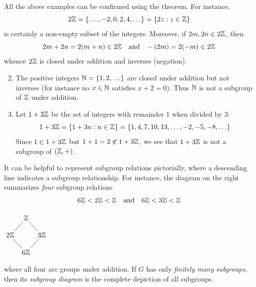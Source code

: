 
\vspace{-5pt}

\begin{examples}{}{}
\exstart All the above examples can be confirmed using the theorem. For instance,
\[2\mathbb{Z}=\{\ldots,-2,0,2,4,\ldots\}=\{2z:z\in\mathbb{Z}\}\]
is certainly a non-empty subset of the integers. Moreover, if $2m,2n\in 2\mathbb{Z}$, then
\[2m+2n=2(m+n)\in 2\mathbb{Z}\quad \text{and}\quad \!-(2m)=2(-m)\in 2\mathbb{Z}\]
whence $2\mathbb{Z}$ is closed under addition and inverses (negation).
\begin{enumerate}\setcounter{enumi}{1}
  \item The positive integers $\mathbb{N}=\{1,2,\ldots \}$ are closed under addition but not inverses (for instance no $x\in\mathbb{N}$ satisfies $x+2=0$). Thus $\mathbb{N}$ is not a subgroup of $\mathbb{Z}$ under addition.
	\item\label{intro:modex} Let $1+3\mathbb{Z}$ be the set of integers with remainder 1 when divided by 3:
	\[1+3\mathbb{Z}=\{1+3n:n\in\mathbb{Z}\}=\{1,4,7,10,13,\ldots, -2,-5,-8,\ldots\}\]
	Since $1\in 1+3\mathbb{Z}$ but $1+1=2\not\in 1+3\mathbb{Z}$, we see that $1+3\mathbb{Z}$ is not a subgroup of $(\mathbb{Z},+)$.
\end{enumerate}
\end{examples}

\goodbreak

\begin{minipage}[t]{0.83\linewidth}\vspace{0pt}

It can be helpful to represent subgroup relations pictorially, where a descending line indicates a subgroup relationship. For instance, the diagram on the right summarizes \emph{four} subgroup relations
\[6\mathbb{Z}<2\mathbb{Z}<\mathbb{Z}\quad\text{and}\quad 6\mathbb{Z}<3\mathbb{Z}<\mathbb{Z}\]
\end{minipage}\hfill\begin{minipage}[t]{0.15\linewidth}\vspace{0pt}
\flushright$\xymatrix @C5pt @R12pt{
	& \Z \ar@{-}[dl] \ar@{-}[dr] &\\
	2\Z \ar@{-}[dr] & & 3\Z \ar@{-}[dl]\\
	& 6\Z &\\
}$
\end{minipage}\medbreak
where all four are groups under addition. If $G$ has only \emph{finitely many subgroups,} then its \emph{subgroup diagram} is the complete depiction of all subgroups.


